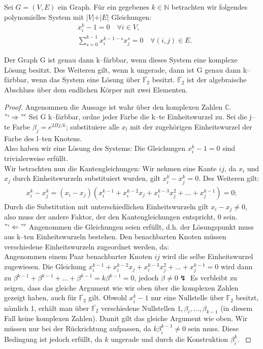 \begin{lemma} \label{3color}
Sei $G = (V, E)$ ein Graph. Für ein gegebenes $k \in \mathbb{N}$ betrachten wir folgendes polynomielles System mit $\vert V \vert + \vert E \vert$ Gleichungen:
\begin{align*}
&x_i^k - 1 = 0 \quad \forall i \in V, \\
& \sum_{s = 0}^{k-1} x_i^{k-1-s}x_j^s = 0 \quad \forall (i,j) \in E. 
\end{align*} 

\noindent Der Graph G ist genau dann k--färbbar, wenn dieses System eine komplexe Lösung besitzt. Des Weiteren gilt, wenn k ungerade, dann ist G genau dann k--färbbar, wenn das System eine Lösung über $\overline{\mathbb{F}_2}$ besitzt. $\overline{\mathbb{F}_2}$ ist der algebraische Abschluss über dem endlichen Körper mit zwei Elementen.
\end{lemma}

\begin{proof}
Angenommen die Aussage ist wahr über den komplexen Zahlen $\mathbb{C}$. 
\\ $"`\Rightarrow"'$ Sei G k--färbbar, ordne jeder Farbe die k--te Einheitswurzel zu. Sei die j--te Farbe $\beta_j = e^{2\Pi j/k}$; substituiere alle $x_l$ mit der zugehörigen Einheitswurzel der Farbe des l--ten Knotens. \\Also haben wir eine Lösung des Systems: Die Gleichungen $x_i^k-1 = 0$ sind trivialerweise erfüllt. \\Wir betrachten nun die Kantengleichungen: Wir nehmen eine Kante $ij$, da $x_i$ und $x_j$ durch Einheitswurzeln substituiert wurden, gilt $x_i^k - x_j^k = 0$. Des Weiteren gilt: 
\begin{align*}
x_i^k-x_j^k = (x_i-x_j)(x_i^{k-1}+x_i^{k-2}x_j+x_i^{k-3}x_j^2+\ldots+x_j^{k-1}) = 0;
\end{align*}   
Durch die Substitution mit unterschiedlichen Einheitswurzeln gilt $x_i - x_j \neq 0$, also muss der andere Faktor, der den Kantengleichungen entspricht, 0 sein.  
\\ $"`\Leftarrow"'$ Angenommen die Gleichungen seien erfüllt, d.h. der Lösungspunkt muss aus k--ten Einheitswurzeln bestehen. Den benachbarten Knoten müssen verschiedene Einheitswurzeln zugeordnet werden, da: \\
Angenommen einem Paar benachbarter Knoten $ij$ wird die selbe Einheitswurzel zugewiesen. Die Gleichung $x_i^{k-1}+x_i^{k-2}x_j+x_i^{k-3}x_j^2+\ldots+x_j^{k-1} = 0$ wird dann zu $\beta^{k-1}+\beta^{k-1}+\ldots+\beta^{k-1} = k\beta^{k-1} = 0$, jedoch $\beta \neq 0 \lightning$ 
Es verbleibt zu zeigen, dass das gleiche Argument wie wir oben über die komplexen Zahlen gezeigt haben, auch für $\overline{\mathbb{F}_2}$ gilt. Obwohl $x_i^k - 1$ nur eine Nullstelle über $\mathbb{F}_2$ besitzt, nämlich 1, erhält man über $\overline{\mathbb{F}_2}$ verschiedene Nullstellen $1,\beta_i,\ldots,\beta_{k-1}$ (in diesem Fall keine komplexen Zahlen). Damit gilt das gleiche Argument wie oben. Wir müssen nur bei der Rückrichtung aufpassen, da $k\beta_i^{k-1} \neq 0$ sein muss. Diese Bedingung ist jedoch erfüllt, da $k$ ungerade und durch die Konstruktion $\beta_i^k$. \cite{Ausgangsartikel}
\end{proof}




